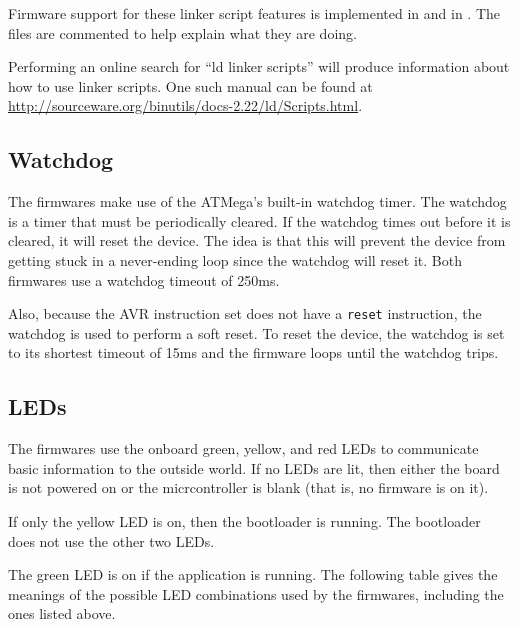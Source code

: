 \documentclass{article}
\begin{document}
Firmware support for these linker script features is implemented in  and
 in .  The files are commented to help explain what
they are doing.

Performing an online search for ``ld linker scripts'' will produce information about how to use
linker scripts.  One such manual can be found at
\url{http://sourceware.org/binutils/docs-2.22/ld/Scripts.html}.

\subsection{Watchdog} \label{ssec:FWWatchdog}
The firmwares make use of the ATMega's built-in watchdog timer.  The watchdog is a timer that must
be periodically cleared.  If the watchdog times out before it is cleared, it will reset the device.
The idea is that this will prevent the device from getting stuck in a never-ending loop since the
watchdog will reset it.  Both firmwares use a watchdog timeout of 250ms.

Also, because the AVR instruction set does not have a \texttt{reset} instruction, the watchdog is
used to perform a soft reset.  To reset the device, the watchdog is set to its shortest timeout of
15ms and the firmware loops until the watchdog trips.

\subsection{LEDs} \label{ssec:FWLEDs}
The firmwares use the onboard green, yellow, and red LEDs to communicate basic information to the
outside world.  If no LEDs are lit, then either the board is not powered on or the micrcontroller is
blank (that is, no firmware is on it).

If only the yellow LED is on, then the bootloader is running.  The bootloader does not use the other
two LEDs.

The green LED is on if the application is running.  The following table gives the meanings of the
possible LED combinations used by the firmwares, including the ones listed above.
\end{document}
